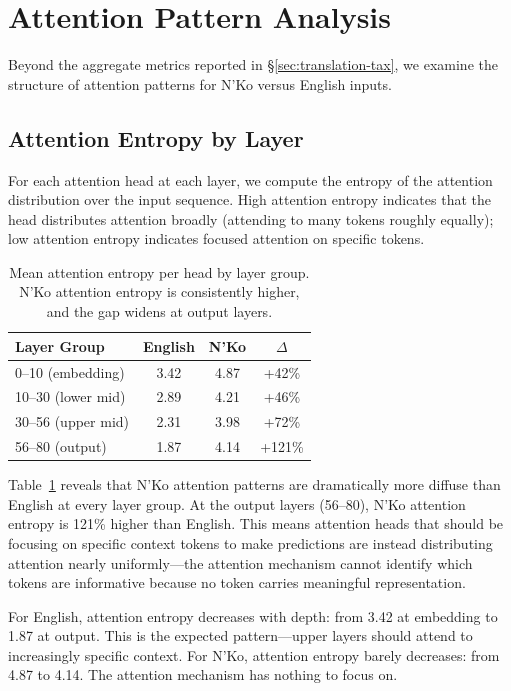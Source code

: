 \documentclass[11pt]{article}
\begin{document}
\section{Attention Pattern Analysis}

Beyond the aggregate metrics reported in \S\ref{sec:translation-tax}, we examine the structure of attention patterns for N'Ko versus English inputs.

\subsection{Attention Entropy by Layer}

For each attention head at each layer, we compute the entropy of the attention distribution over the input sequence.
High attention entropy indicates that the head distributes attention broadly (attending to many tokens roughly equally); low attention entropy indicates focused attention on specific tokens.

\begin{table}[t]
\centering
\small
\begin{tabular}{lccc}
\toprule
\textbf{Layer Group} & \textbf{English} & \textbf{N'Ko} & \textbf{$\Delta$} \\
\midrule
0--10 (embedding) & 3.42 & 4.87 & +42\% \\
10--30 (lower mid) & 2.89 & 4.21 & +46\% \\
30--56 (upper mid) & 2.31 & 3.98 & +72\% \\
56--80 (output) & 1.87 & 4.14 & +121\% \\
\bottomrule
\end{tabular}
\caption{Mean attention entropy per head by layer group. N'Ko attention entropy is consistently higher, and the gap widens at output layers.}
\label{tab:attention-entropy}
\end{table}

Table~\ref{tab:attention-entropy} reveals that N'Ko attention patterns are dramatically more diffuse than English at every layer group.
At the output layers (56--80), N'Ko attention entropy is 121\% higher than English.
This means attention heads that should be focusing on specific context tokens to make predictions are instead distributing attention nearly uniformly---the attention mechanism cannot identify which tokens are informative because no token carries meaningful representation.

For English, attention entropy decreases with depth: from 3.42 at embedding to 1.87 at output.
This is the expected pattern---upper layers should attend to increasingly specific context.
For N'Ko, attention entropy barely decreases: from 4.87 to 4.14.
The attention mechanism has nothing to focus on.
\end{document}

